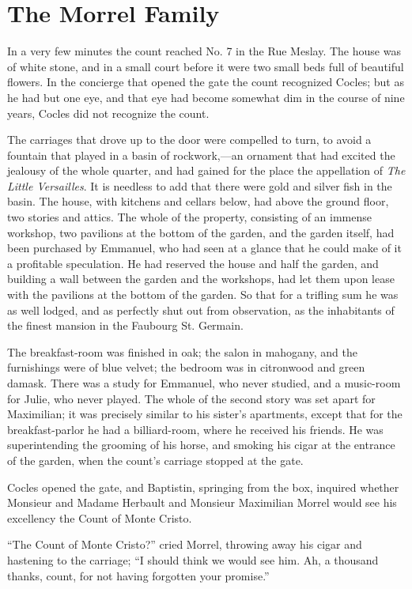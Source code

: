 \chapter{The Morrel Family}

In a very few minutes the count reached No. 7 in the Rue Meslay. The
house was of white stone, and in a small court before it were two small
beds full of beautiful flowers. In the concierge that opened the gate
the count recognized Cocles; but as he had but one eye, and that eye
had become somewhat dim in the course of nine years, Cocles did not
recognize the count.

The carriages that drove up to the door were compelled to turn, to
avoid a fountain that played in a basin of rockwork,—an ornament that
had excited the jealousy of the whole quarter, and had gained for the
place the appellation of \textit{The Little Versailles}. It is needless to add
that there were gold and silver fish in the basin. The house, with
kitchens and cellars below, had above the ground floor, two stories and
attics. The whole of the property, consisting of an immense workshop,
two pavilions at the bottom of the garden, and the garden itself, had
been purchased by Emmanuel, who had seen at a glance that he could make
of it a profitable speculation. He had reserved the house and half the
garden, and building a wall between the garden and the workshops, had
let them upon lease with the pavilions at the bottom of the garden. So
that for a trifling sum he was as well lodged, and as perfectly shut
out from observation, as the inhabitants of the finest mansion in the
Faubourg St. Germain.

The breakfast-room was finished in oak; the salon in mahogany, and the
furnishings were of blue velvet; the bedroom was in citronwood and
green damask. There was a study for Emmanuel, who never studied, and a
music-room for Julie, who never played. The whole of the second story
was set apart for Maximilian; it was precisely similar to his sister’s
apartments, except that for the breakfast-parlor he had a
billiard-room, where he received his friends. He was superintending the
grooming of his horse, and smoking his cigar at the entrance of the
garden, when the count’s carriage stopped at the gate.

Cocles opened the gate, and Baptistin, springing from the box, inquired
whether Monsieur and Madame Herbault and Monsieur Maximilian Morrel
would see his excellency the Count of Monte Cristo.

“The Count of Monte Cristo?” cried Morrel, throwing away his cigar and
hastening to the carriage; “I should think we would see him. Ah, a
thousand thanks, count, for not having forgotten your promise.”


